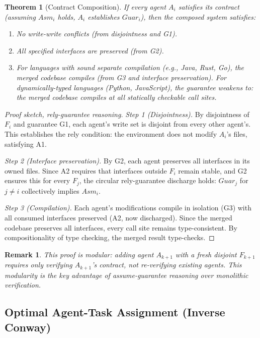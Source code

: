 \documentclass[11pt, a4paper, logo, copyright]{googledeepmind}
\newtheorem{theorem}{Theorem}[section]
\newtheorem*{remark}{Remark}
\begin{document}
\begin{theorem}[Contract Composition]
\label{thm:composition}
If every agent $A_i$ satisfies its contract (assuming $Asm_i$ holds, $A_i$ establishes $Guar_i$), then the composed system satisfies:
\begin{enumerate}[nosep]
    \item No write-write conflicts (from disjointness and G1).
    \item All specified interfaces are preserved (from G2).
    \item For languages with sound separate compilation (e.g., Java, Rust, Go), the merged codebase compiles (from G3 and interface preservation). For dynamically-typed languages (Python, JavaScript), the guarantee weakens to: the merged codebase compiles at all statically checkable call sites.
\end{enumerate}
\end{theorem}

\begin{proof}[Proof sketch, rely-guarantee reasoning]
\textit{Step 1 (Disjointness).}
By disjointness of $F_i$ and guarantee G1, each agent's write set is disjoint from every other agent's. This establishes the rely condition: the environment does not modify $A_i$'s files, satisfying A1.

\textit{Step 2 (Interface preservation).}
By G2, each agent preserves all interfaces in its owned files. Since A2 requires that interfaces outside $F_i$ remain stable, and G2 ensures this for every $F_j$, the circular rely-guarantee discharge holds: $Guar_j$ for $j \neq i$ collectively implies $Asm_i$.

\textit{Step 3 (Compilation).}
Each agent's modifications compile in isolation (G3) with all consumed interfaces preserved (A2, now discharged). Since the merged codebase preserves all interfaces, every call site remains type-consistent. By compositionality of type checking, the merged result type-checks.
\end{proof}

\begin{remark}
This proof is modular: adding agent $A_{k+1}$ with a fresh disjoint $F_{k+1}$ requires only verifying $A_{k+1}$'s contract, not re-verifying existing agents. This modularity is the key advantage of assume-guarantee reasoning over monolithic verification.
\end{remark}

\subsection{Optimal Agent-Task Assignment (Inverse Conway)}
\end{document}
